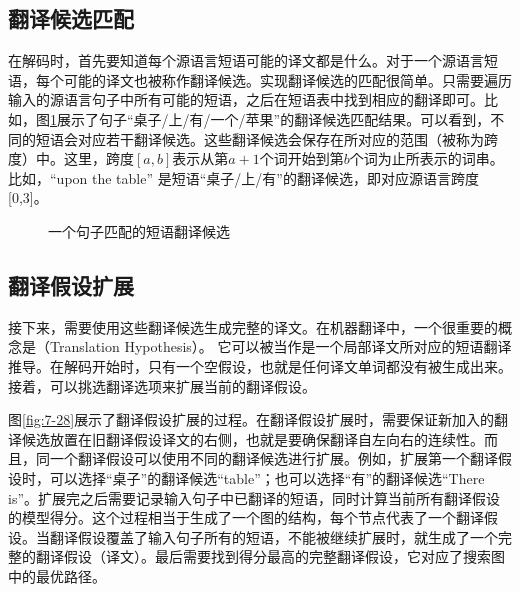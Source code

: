 
\subsection{翻译候选匹配}

\parinterval 在解码时，首先要知道每个源语言短语可能的译文都是什么。对于一个源语言短语，每个可能的译文也被称作翻译候选。实现翻译候选的匹配很简单。只需要遍历输入的源语言句子中所有可能的短语，之后在短语表中找到相应的翻译即可。比如，图\ref{fig:7-27}展示了句子“桌子/上/有/一个/苹果”的翻译候选匹配结果。可以看到，不同的短语会对应若干翻译候选。这些翻译候选会保存在所对应的范围（被称为跨度）中。这里，跨度$[a,b]$表示从第$a+1$个词开始到第$b$个词为止所表示的词串。比如，“upon the table” 是短语“桌子/上/有”的翻译候选，即对应源语言跨度[0,3]。

\begin{figure}[htp]
\centering

\caption{一个句子匹配的短语翻译候选}
\label{fig:7-27}
\end{figure}


\subsection{翻译假设扩展}

\parinterval 接下来，需要使用这些翻译候选生成完整的译文。在机器翻译中，一个很重要的概念是{\small{}}（Translation Hypothesis）。 它可以被当作是一个局部译文所对应的短语翻译推导。在解码开始时，只有一个空假设，也就是任何译文单词都没有被生成出来。接着，可以挑选翻译选项来扩展当前的翻译假设。

\parinterval 图\ref{fig:7-28}展示了翻译假设扩展的过程。在翻译假设扩展时，需要保证新加入的翻译候选放置在旧翻译假设译文的右侧，也就是要确保翻译自左向右的连续性。而且，同一个翻译假设可以使用不同的翻译候选进行扩展。例如，扩展第一个翻译假设时，可以选择“桌子”的翻译候选“table”；也可以选择“有”的翻译候选“There is”。扩展完之后需要记录输入句子中已翻译的短语，同时计算当前所有翻译假设的模型得分。这个过程相当于生成了一个图的结构，每个节点代表了一个翻译假设。当翻译假设覆盖了输入句子所有的短语，不能被继续扩展时，就生成了一个完整的翻译假设（译文）。最后需要找到得分最高的完整翻译假设，它对应了搜索图中的最优路径。

